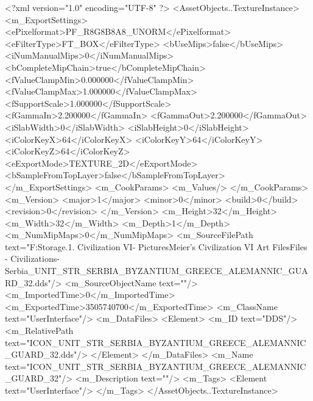 <?xml version="1.0" encoding="UTF-8" ?>
<AssetObjects..TextureInstance>
	<m_ExportSettings>
		<ePixelformat>PF_R8G8B8A8_UNORM</ePixelformat>
		<eFilterType>FT_BOX</eFilterType>
		<bUseMips>false</bUseMips>
		<iNumManualMips>0</iNumManualMips>
		<bCompleteMipChain>true</bCompleteMipChain>
		<fValueClampMin>0.000000</fValueClampMin>
		<fValueClampMax>1.000000</fValueClampMax>
		<fSupportScale>1.000000</fSupportScale>
		<fGammaIn>2.200000</fGammaIn>
		<fGammaOut>2.200000</fGammaOut>
		<iSlabWidth>0</iSlabWidth>
		<iSlabHeight>0</iSlabHeight>
		<iColorKeyX>64</iColorKeyX>
		<iColorKeyY>64</iColorKeyY>
		<iColorKeyZ>64</iColorKeyZ>
		<eExportMode>TEXTURE_2D</eExportMode>
		<bSampleFromTopLayer>false</bSampleFromTopLayer>
	</m_ExportSettings>
	<m_CookParams>
		<m_Values/>
	</m_CookParams>
	<m_Version>
		<major>1</major>
		<minor>0</minor>
		<build>0</build>
		<revision>0</revision>
	</m_Version>
	<m_Height>32</m_Height>
	<m_Width>32</m_Width>
	<m_Depth>1</m_Depth>
	<m_NumMipMaps>0</m_NumMipMaps>
	<m_SourceFilePath text="F:\Mod Storage\2.1. Civilization VI\Mods\Archive - Pictures\Sid Meier's Civilization VI Art Files\Art Files - Civilizations\Civilization - Serbia\ICON_UNIT_STR_SERBIA_BYZANTIUM_GREECE_ALEMANNIC_GUARD_32.dds"/>
	<m_SourceObjectName text=""/>
	<m_ImportedTime>0</m_ImportedTime>
	<m_ExportedTime>3505740700</m_ExportedTime>
	<m_ClassName text="UserInterface"/>
	<m_DataFiles>
		<Element>
			<m_ID text="DDS"/>
			<m_RelativePath text="ICON_UNIT_STR_SERBIA_BYZANTIUM_GREECE_ALEMANNIC_GUARD_32.dds"/>
		</Element>
	</m_DataFiles>
	<m_Name text="ICON_UNIT_STR_SERBIA_BYZANTIUM_GREECE_ALEMANNIC_GUARD_32"/>
	<m_Description text=""/>
	<m_Tags>
		<Element text="UserInterface"/>
	</m_Tags>
</AssetObjects..TextureInstance>

